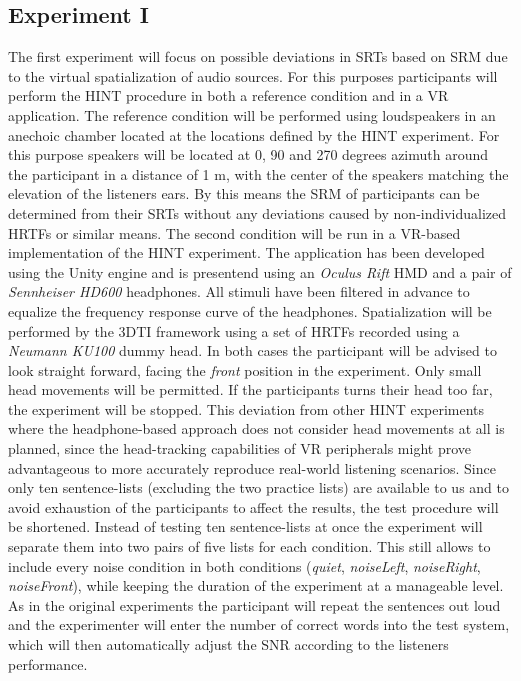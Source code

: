\documentclass[a4paper,11pt]{article}%
\renewcommand{\\}{\vspace*{0.5\baselineskip} \newline}
\begin{document}
\subsection{Experiment I}
The first experiment will focus on possible deviations in \ac{SRT}s based on \ac{SRM} due to the virtual spatialization of audio sources. For this purposes participants will perform the \ac{HINT} procedure in both a reference condition and in a \ac{VR} application. The reference condition will be performed using loudspeakers in an anechoic chamber located at the locations defined by the \ac{HINT} experiment. For this purpose speakers will be located at 0, 90 and 270 degrees azimuth around the participant in a distance of 1 m, with the center of the speakers matching the elevation of the listeners ears. By this means the \ac{SRM} of participants can be determined from their \ac{SRT}s without any deviations caused by non-individualized \ac{HRTF}s or similar means. 
\newline
\newline
The second condition will be run in a \ac{VR}-based implementation of the \ac{HINT} experiment. The application has been developed using the Unity engine and is presentend using an \textit{Oculus Rift} \ac{HMD} and a pair of \textit{Sennheiser HD600} headphones. All stimuli have been filtered in advance to equalize the frequency response curve of the headphones. Spatialization will be performed by the \ac{3DTI} framework using a set of \ac{HRTF}s recorded using a \textit{Neumann KU100} dummy head.
\newline
\newline
In both cases the participant will be advised to look straight forward, facing the \textit{front} position in the experiment. Only small head movements will be permitted. If the participants turns their head too far, the experiment will be stopped. This deviation from other \ac{HINT} experiments where the headphone-based approach does not consider head movements at all is planned, since the head-tracking capabilities of \ac{VR} peripherals might prove advantageous to more accurately reproduce real-world listening scenarios.
\newline
\newline
Since only ten sentence-lists (excluding the two practice lists) are available to us and to avoid exhaustion of the participants to affect the results, the test procedure will be shortened. Instead of testing ten sentence-lists at once the experiment will separate them into two pairs of five lists for each condition. This still allows to include every noise condition in both conditions (\textit{quiet}, \textit{noiseLeft}, \textit{noiseRight}, \textit{noiseFront}), while keeping the duration of the experiment at a manageable level. As in the original experiments the participant will repeat the sentences out loud and the experimenter will enter the number of correct words into the test system, which will then automatically adjust the \ac{SNR} according to the listeners performance.
\end{document}
